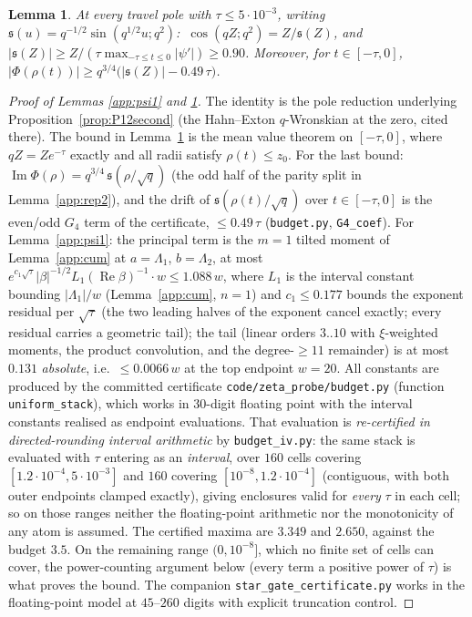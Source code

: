 \documentclass[11pt]{article}
\theoremstyle{plain}
\newtheorem{lemma}[theorem]{Lemma}
\theoremstyle{definition}
\theoremstyle{remark}
\begin{document}
\begin{lemma}\label{app:sZ}
At every travel pole with $\tau\le5\cdot10^{-3}$, writing
$\mathfrak s(u)=q^{-1/2}\sin(q^{1/2}u;q^2)$: $\ \cos(qZ;q^2)=Z/\mathfrak s(Z)$, and
$|\mathfrak s(Z)|\ge Z/(\tau\max_{-\tau\le t\le0}|\psi'|)\ge0.90$. Moreover, for $t\in[-\tau,0]$,
$|\Phi(\rho(t))|\ge q^{3/4}\bigl(|\mathfrak s(Z)|-0.49\,\tau\bigr)$.
\end{lemma}

\begin{proof}[Proof of Lemmas \ref{app:psi1} and \ref{app:sZ}]
The identity is the pole reduction underlying Proposition~\ref{prop:P12second} (the Hahn--Exton
$q$-Wronskian at the zero, cited there). The bound in Lemma~\ref{app:sZ} is the mean value theorem
on $[-\tau,0]$, where $qZ=Ze^{-\tau}$ exactly and all radii satisfy $\rho(t)\le z_0$. For the last
bound: $\operatorname{Im}\Phi(\rho)=q^{3/4}\,\mathfrak s(\rho/\sqrt q)$ (the odd half of the parity
split in Lemma~\ref{app:rep2}), and the drift of $\mathfrak s(\rho(t)/\sqrt q)$ over $t\in[-\tau,0]$
is the even/odd $G_4$ term of the certificate, $\le0.49\,\tau$ (\texttt{budget.py},
\texttt{G4\_coef}). For
Lemma~\ref{app:psi1}: the principal term is the $m=1$ tilted moment of Lemma~\ref{app:cum} at
$a=\Lambda_1$, $b=\Lambda_2$, at most
$e^{c_1\sqrt\tau}|\beta|^{-1/2}L_1(\operatorname{Re}\beta)^{-1}\cdot w\le1.088\,w$, where $L_1$
is the interval constant bounding $|\Lambda_1|/w$ (Lemma~\ref{app:cum}, $n=1$) and
$c_1\le0.177$ bounds the exponent residual per $\sqrt\tau$ (the two leading halves of the exponent
cancel exactly; every residual carries a geometric tail); the tail (linear orders $3..10$ with
$\xi$-weighted moments, the product convolution, and the degree-$\ge11$ remainder) is at most
$0.131$ \emph{absolute}, i.e.\ $\le0.0066\,w$ at the top endpoint $w=20$. All constants are
produced by the committed certificate \texttt{code/zeta\_probe/budget.py} (function
\texttt{uniform\_stack}), which works in $30$-digit floating point with the interval constants
realised as endpoint evaluations. That evaluation is \emph{re-certified in directed-rounding
interval arithmetic} by \texttt{budget\_iv.py}: the same stack is evaluated with $\tau$ entering as
an \emph{interval}, over $160$ cells covering $[1.2\cdot10^{-4},5\cdot10^{-3}]$ and $160$ covering
$[10^{-8},1.2\cdot10^{-4}]$ (contiguous, with both outer endpoints clamped exactly), giving
enclosures valid for \emph{every} $\tau$ in each cell; so on
those ranges neither the floating-point arithmetic nor the monotonicity of any atom is assumed. The
certified maxima are $3.349$ and $2.650$, against the budget $3.5$. On the remaining range
$(0,10^{-8}]$, which no finite set of cells can cover, the power-counting argument below (every
term a positive power of $\tau$) is what proves the bound. The companion
\texttt{star\_gate\_certificate.py} works in the floating-point model at $45$--$260$ digits with
explicit truncation control.
\end{proof}
\end{document}
